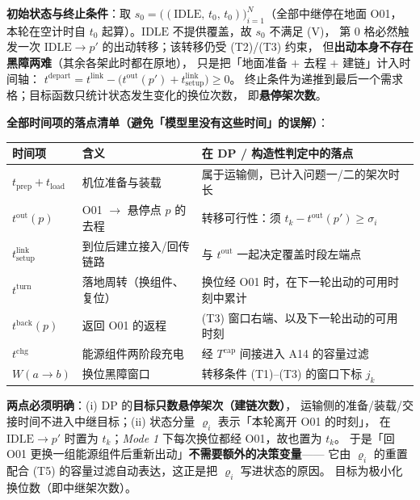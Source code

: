 \documentclass[12pt,a4paper,fontset=windows]{ctexart}
\begin{document}
\noindent\textbf{初始状态与终止条件}：取
$s_0=\big((\mathrm{IDLE},\,t_0,\,t_0)\big)_{i=1}^{N}$（全部中继停在地面 O01，
本轮在空计时自 $t_0$ 起算）。$\mathrm{IDLE}$ 不提供覆盖，故 $s_0$ 不满足 (V)，
第 0 格必然触发一次 $\mathrm{IDLE}\to p'$ 的出动转移；该转移仍受 (T2)/(T3) 约束，
但\textbf{出动本身不存在黑障两难}（其余各架此时都在原地），
只是把「地面准备 $+$ 去程 $+$ 建链」计入时间轴：
$t^{\mathrm{depart}}=t^{\mathrm{link}}-\big(t^{\mathrm{out}}(p')+t^{\mathrm{link}}_{\mathrm{setup}}\big)\ge 0$。
终止条件为递推到最后一个需求格；目标函数只统计状态发生变化的换位次数，
即\textbf{悬停架次数}。

\noindent\textbf{全部时间项的落点清单（避免「模型里没有这些时间」的误解）}：

\begin{center}
\small
\begin{tabular}{@{}l>{\raggedright\arraybackslash}p{4.2cm}>{\raggedright\arraybackslash}p{7.2cm}@{}}
\toprule
时间项 & 含义 & 在 DP / 构造性判定中的落点 \\
\midrule
$t_{\mathrm{prep}}+t_{\mathrm{load}}$ & 机位准备与装载 & 属于运输侧，已计入问题一/二的架次时长 \\
$t^{\mathrm{out}}(p)$ & O01 $\to$ 悬停点 $p$ 的去程 & 转移可行性：须 $t_k-t^{\mathrm{out}}(p')\ge\sigma_i$ \\
$t^{\mathrm{link}}_{\mathrm{setup}}$ & 到位后建立接入/回传链路 & 与 $t^{\mathrm{out}}$ 一起决定覆盖时段左端点 \\
$t^{\mathrm{turn}}$ & 落地周转（换组件、复位） & 换位经 O01 时，在下一轮出动的可用时刻中累计 \\
$t^{\mathrm{back}}(p)$ & 返回 O01 的返程 & (T3) 窗口右端、以及下一轮出动的可用时刻 \\
$t^{\mathrm{chg}}$ & 能源组件两阶段充电 & 经 $T^{\mathrm{cap}}$ 间接进入 A14 的容量过滤 \\
$W(a\!\to\!b)$ & 换位黑障窗口 & 转移条件 (T1)--(T3) 的窗口下标 $j_k$ \\
\bottomrule
\end{tabular}
\end{center}

\noindent\textbf{两点必须明确}：(i) DP 的\textbf{目标只数悬停架次（建链次数）}，
运输侧的准备/装载/交接时间不进入中继目标；(ii) 状态分量 $\varrho_i$ 表示「本轮离开 O01 的时刻」，
在 $\mathrm{IDLE}\to p'$ 时置为 $t_k$；\emph{Mode 1} 下每次换位都经 O01，故也置为 $t_k$。
于是「回 O01 更换一组能源组件后重新出动」\textbf{不需要额外的决策变量}——
它由 $\varrho_i$ 的重置配合 (T5) 的容量过滤自动表达，这正是把 $\varrho_i$ 写进状态的原因。
目标为极小化换位数（即中继架次数）。
\end{document}
